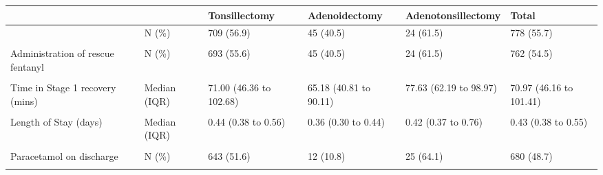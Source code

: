 \documentclass[
  letterpaper,
  DIV=11,
  numbers=noendperiod]{scrreprt}
\begin{document}
\begin{table}
{\fontsize{12.0pt}{14.4pt}\selectfont
\begin{tabular*}{\linewidth}{@{\extracolsep{\fill}}llllll}
\toprule
 &  & Tonsillectomy & Adenoidectomy & Adenotonsillectomy & Total \\ 
\midrule\addlinespace[2.5pt]
{Administration of rescue opioids} & {N (\%)} & {709 (56.9)} & {45 (40.5)} & {24 (61.5)} & {778 (55.7)} \\ 
{\cellcolor[HTML]{F2F2F2}{Administration of rescue morphine}} & {\cellcolor[HTML]{F2F2F2}{N (\%)}} & {\cellcolor[HTML]{F2F2F2}{23 (1.8)}} & {\cellcolor[HTML]{F2F2F2}{0 (0.0)}} & {\cellcolor[HTML]{F2F2F2}{0 (0.0)}} & {\cellcolor[HTML]{F2F2F2}{23 (1.6)}} \\ 
{Administration of rescue fentanyl} & {N (\%)} & {693 (55.6)} & {45 (40.5)} & {24 (61.5)} & {762 (54.5)} \\ 
{\cellcolor[HTML]{F2F2F2}{Administration of rescue opioids, (OME mg)}} & {\cellcolor[HTML]{F2F2F2}{Median (IQR)}} & {\cellcolor[HTML]{F2F2F2}{20.00 (12.00 to 20.00)}} & {\cellcolor[HTML]{F2F2F2}{20.00 (12.00 to 20.00)}} & {\cellcolor[HTML]{F2F2F2}{20.00 (12.00 to 20.00)}} & {\cellcolor[HTML]{F2F2F2}{20.00 (12.00 to 20.00)}} \\ 
{Time in Stage 1 recovery (mins)} & {Median (IQR)} & {71.00 (46.36 to 102.68)} & {65.18 (40.81 to 90.11)} & {77.63 (62.19 to 98.97)} & {70.97 (46.16 to 101.41)} \\ 
{\cellcolor[HTML]{F2F2F2}{Pain score at rest 3hrs post-op (Median)}} & {\cellcolor[HTML]{F2F2F2}{Median (IQR)}} & {\cellcolor[HTML]{F2F2F2}{1.00 (0.00 to 2.00)}} & {\cellcolor[HTML]{F2F2F2}{0.50 (0.00 to 1.00)}} & {\cellcolor[HTML]{F2F2F2}{1.00 (0.00 to 2.00)}} & {\cellcolor[HTML]{F2F2F2}{1.00 (0.00 to 2.00)}} \\ 
{Length of Stay (days)} & {Median (IQR)} & {0.44 (0.38 to 0.56)} & {0.36 (0.30 to 0.44)} & {0.42 (0.37 to 0.76)} & {0.43 (0.38 to 0.55)} \\ 
{\cellcolor[HTML]{F2F2F2}{Same day discharge}} & {\cellcolor[HTML]{F2F2F2}{N (\%)}} & {\cellcolor[HTML]{F2F2F2}{951 (76.3)}} & {\cellcolor[HTML]{F2F2F2}{92 (82.9)}} & {\cellcolor[HTML]{F2F2F2}{29 (74.4)}} & {\cellcolor[HTML]{F2F2F2}{1072 (76.7)}} \\ 
{Paracetamol on discharge} & {N (\%)} & {643 (51.6)} & {12 (10.8)} & {25 (64.1)} & {680 (48.7)} \\ 
{\cellcolor[HTML]{F2F2F2}{NSAID on discharge}} & {\cellcolor[HTML]{F2F2F2}{N (\%)}} & {\cellcolor[HTML]{F2F2F2}{770 (61.7)}} & {\cellcolor[HTML]{F2F2F2}{11 (9.9)}} & {\cellcolor[HTML]{F2F2F2}{25 (64.1)}} & {\cellcolor[HTML]{F2F2F2}{806 (57.7)}} \\ 

\end{tabular*}}
\end{table}
\end{document}
